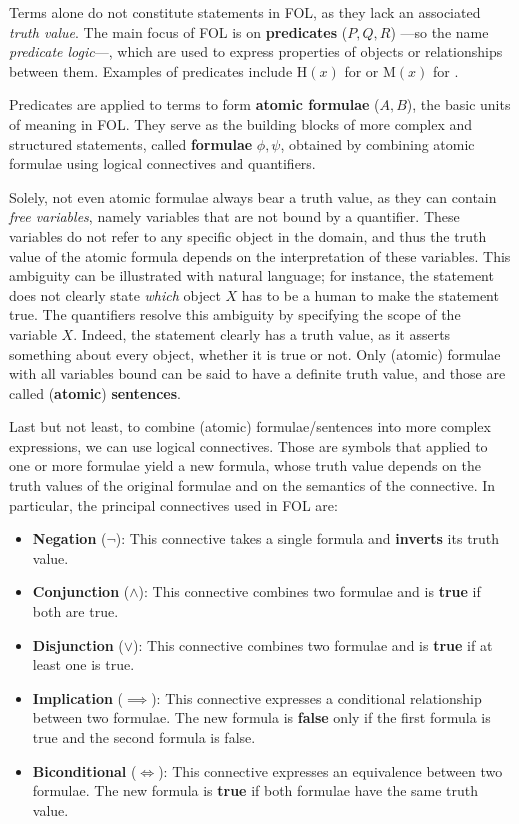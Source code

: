 Terms alone do not constitute statements in FOL, as they lack an associated \textit{truth value}.
The main focus of FOL is on \textbf{predicates} (\(P,Q,R\)) ---so the name \textit{predicate logic}---, which are used to express properties of objects or relationships between them.
Examples of predicates include \(\text{H}(x)\) for  or \(\text{M}(x)\) for .


Predicates are applied to terms to form \textbf{atomic formulae} (\(A,B\)), the basic units of meaning in FOL\@. They serve as the building blocks of more complex and structured statements, called \textbf{formulae} \(\phi, \psi\), obtained by combining atomic formulae using logical connectives and quantifiers.

Solely, not even atomic formulae always bear a truth value, as they can contain \textit{free variables}, namely variables that are not bound by a quantifier. These variables do not refer to any specific object in the domain, and thus the truth value of the atomic formula depends on the interpretation of these variables.
This ambiguity can be illustrated with natural language; for instance, the statement  does not clearly state \textit{which} object \(X\) has to be a human to make the statement true.
The quantifiers resolve this ambiguity by specifying the scope of the variable \(X\). Indeed, the statement  clearly has a truth value, as it asserts something about every object, whether it is true or not.
Only (atomic) formulae with all variables bound can be said to have a definite truth value, and those are called (\textbf{atomic}) \textbf{sentences}.

Last but not least, to combine (atomic) formulae/sentences into more complex expressions, we can use logical connectives. Those are symbols that applied to one or more formulae yield a new formula, whose truth value depends on the truth values of the original formulae and on the semantics of the connective.
In particular, the principal connectives used in FOL are:

\begin{itemize}
  \item \textbf{Negation} (\(\neg\)): This connective takes a single formula and \textbf{inverts} its truth value.
  \item \textbf{Conjunction} (\(\land\)): This connective combines two formulae and is \textbf{true} if both are true.
  \item \textbf{Disjunction} (\(\lor\)): This connective combines two formulae and is \textbf{true} if at least one is true.
  \item \textbf{Implication} (\(\implies\)): This connective expresses a conditional relationship between two formulae. The new formula is \textbf{false} only if the first formula is true and the second formula is false.
  \item \textbf{Biconditional} (\(\iff\)): This connective expresses an equivalence between two formulae. The new formula is \textbf{true} if both formulae have the same truth value.
\end{itemize}

